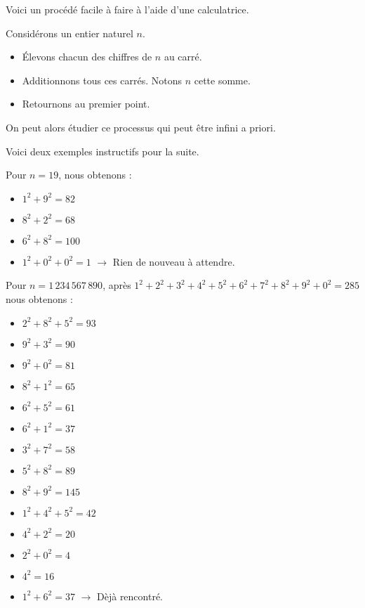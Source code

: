 Voici un procédé facile à faire à l'aide d'une calculatrice.


\medskip

\begin{tcolorbox}
	Considérons un entier naturel $n$.
	
	\begin{itemize}[label = \small\textbullet]
		\item Élevons chacun des chiffres de $n$ au carré.
		
		\item Additionnons tous ces carrés. Notons $n$ cette somme.
		
		\item Retournons au premier point.
	\end{itemize}

	On peut alors étudier ce processus qui peut être infini a priori.
\end{tcolorbox}

Voici deux exemples instructifs pour la suite.


\begin{example}
	Pour $n = 19$, nous obtenons :
	\begin{itemize}[label=\textbullet]
		\item $1^2 + 9^2 = 82$
		\item $8^2 + 2^2 = 68$
		\item $6^2 + 8^2 = 100$
		\item $1^2 + 0^2 + 0^2 = 1$ $\rightarrow$ Rien de nouveau à attendre.
	\end{itemize}
\end{example}


\begin{example}
	Pour $n = 1\,234\,567\,890$, après $1^2 + 2^2 + 3^2 + 4^2 + 5^2 + 6^2 + 7^2 + 8^2 + 9^2 + 0^2 = 285$ nous obtenons :
	\vspace{-.7em}
	\begin{multicols}{2}
		\begin{itemize}[label=\textbullet]
			\item $2^2 + 8^2 + 5^2 = 93$
			\item $9^2 + 3^2 = 90$
			\item $9^2 + 0^2 = 81$
			\item $8^2 + 1^2 = 65$
			\item $6^2 + 5^2 = 61$
			\item $6^2 + 1^2 = 37$
			\item $3^2 + 7^2 = 58$
		\end{itemize}
		\columnbreak
		\begin{itemize}[label=\textbullet]
			\item $5^2 + 8^2 = 89$
			\item $8^2 + 9^2 = 145$
			\item $1^2 + 4^2 + 5^2 = 42$
			\item $4^2 + 2^2 = 20$
			\item $2^2 + 0^2 = 4$
			\item $4^2 = 16$ 
			\item $1^2 + 6^2 = 37$ $\rightarrow$ Dèjà rencontré.
		\end{itemize}
	\end{multicols}
\end{example}


